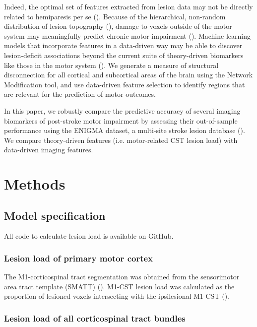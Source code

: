 \documentclass[10pt]{article}
\begin{document}
Indeed, the optimal set of features extracted from lesion data may not be directly related to hemiparesis per se (\cite{Bzdok2020-py, Sperber2021-lw}). Because of the hierarchical, non-random distribution of lesion topography (\cite{Mah2014-cb,Wang2019-dz}), damage to voxels outside of the motor system may meaningfully predict chronic motor impairment (\cite{Sperber2021-lw}). Machine learning models that incorporate features in a data-driven way may be able to discover lesion-deficit associations beyond the current suite of theory-driven biomarkers like those in the motor system (\cite{Kasties2021-rm, Calesella2021-kp}). We generate a measure of structural disconnection for all cortical and subcortical areas of the brain using the Network Modification tool, and use data-driven feature selection to identify regions that are relevant for the prediction of motor outcomes. 


In this paper, we robustly compare the predictive accuracy of several imaging biomarkers of post-stroke motor impairment by assessing their out-of-sample performance using the ENIGMA dataset, a multi-site stroke lesion database (\cite{Liew2020-ps}). We compare theory-driven features (i.e. motor-related CST lesion load) with data-driven imaging features. 



\section{Methods}



\subsection{Model specification}
All code to calculate lesion load is available on GitHub. 

\subsubsection{Lesion load of primary motor cortex}
The M1-corticospinal tract segmentation was obtained from the sensorimotor area tract template (SMATT) (\cite{Archer2018-ti}). M1-CST lesion load was calculated as the proportion of lesioned voxels intersecting with the ipsilesional M1-CST (\cite{Zhu2010-qh}).

\subsubsection{Lesion load of all corticospinal tract bundles}
\end{document}
